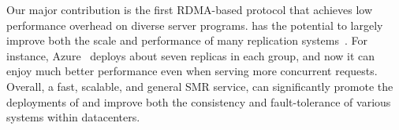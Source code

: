 
Our major contribution is the first RDMA-based \paxos protocol that achieves  
low performance overhead on diverse server programs. \xxx has the potential 
to largely improve both the scale and performance of many replication 
systems~\cite{azure:book,manos:hotdep10,crane:sosp15,rex:eurosys14, 
ssmr:dsn14,spaxos:srds12}. For instance, Azure~\cite{azure:book} 
deploys about seven replicas in each \paxos group, and now it can enjoy 
much better performance even when serving more concurrent requests. 
Overall, a fast, scalable, and general SMR service, \xxx can significantly 
promote the deployments of \paxos and improve both the consistency and 
fault-tolerance of various systems within datacenters.




